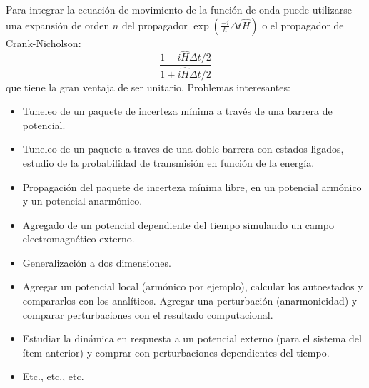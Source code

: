 \documentclass[12pt,a4paper]{article}
\begin{document}
Para integrar la ecuación de movimiento de la función de onda puede utilizarse una expansión de orden $n$ del propagador $\exp\left(\frac{-i}{\hbar}\Delta t\hat{H}\right)$ o el propagador de Crank-Nicholson:
\[
\frac{1-i\hat{H}\Delta t/2}{1+i\hat{H}\Delta t/2}
\]
que tiene la gran ventaja de ser unitario.
Problemas interesantes:
\begin{itemize}
\item Tuneleo de un paquete de incerteza mínima a través de una barrera de potencial.
\item Tuneleo de un paquete a traves de una doble barrera con estados ligados, estudio de la probabilidad de transmisión en función de la energía.
\item Propagación del paquete de incerteza mínima libre, en un potencial armónico y un potencial anarmónico.
\item Agregado de un potencial dependiente del tiempo simulando un campo electromagnético externo.
\item Generalización a dos dimensiones.
\item Agregar un potencial local (armónico por ejemplo), calcular los autoestados y compararlos con los analíticos. Agregar una perturbación (anarmonicidad) y comparar perturbaciones con el resultado computacional.
\item Estudiar la dinámica en respuesta a un potencial externo (para el sistema del ítem anterior) y comprar con perturbaciones dependientes del tiempo.
\item Etc., etc., etc. 
\end{itemize}
\end{document}
